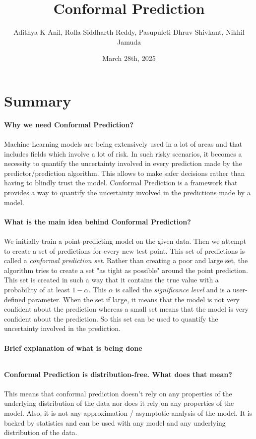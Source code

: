 \documentclass{article}
\title{Conformal Prediction}
\author{Adithya K Anil, Rolla Siddharth Reddy, Pasupuleti Dhruv Shivkant, Nikhil Jamuda}
\date{March 28th, 2025}
\begin{document}
\maketitle
\section*{Summary}
\textbf{Why we need Conformal Prediction? \\\\}
Machine Learning models are being extensively used in a lot of areas and that includes fields which involve a lot of risk. In such risky scenarios, it becomes a necessity to quantify the uncertainty involved in every prediction made by the predictor/prediction algorithm. This allows to make safer decisions rather than having to blindly trust the model. Conformal Prediction is a framework that provides a way to quantify the uncertainty involved in the predictions made by a model.\\\\

\textbf{What is the main idea behind Conformal Prediction? \\\\}
We initially train a point-predicting model on the given data. Then we attempt to create a set of predictions for every new test point. This set of predictions is called a \textit{conformal prediction set}. Rather than creating a poor and large set, the algorithm tries to create a set "as tight as possible" around the point prediction. This set is created in such a way that it contains the true value with a probability of at least \(1 - \alpha\). This \(\alpha\) is called the \textit{significance level} and is a user-defined parameter. When the set if large, it means that the model is not very confident about the prediction whereas a small set means that the model is very confident about the prediction. So this set can be used to quantify the uncertainty involved in the prediction.\\\\

\textbf{Brief explanation of what is being done\\\\}





\textbf{Conformal Prediction is distribution-free. What does that mean? \\\\}
This means that conformal prediction doesn't rely on any properties of the underlying distribution of the data nor does it rely on any properties of the model. Also, it is not any approximation / asymptotic analysis of the model. It is backed by statistics and can be used with any model and any underlying distribution of the data.\\\\
\end{document}
